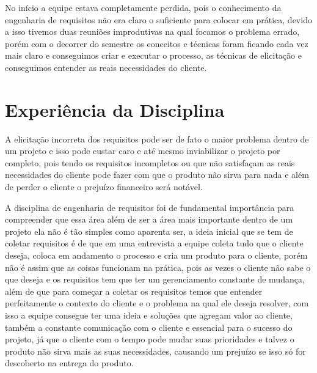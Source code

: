   No início a equipe estava completamente perdida, pois o conhecimento da engenharia de requisitos não era claro o suficiente para colocar em
  prática, devido a isso tivemos duas reuniões improdutivas na qual focamos o problema errado, porém com o decorrer do semestre os conceitos e
  técnicas foram ficando cada vez mais claro e conseguimos criar e executar o processo, as técnicas de elicitação e conseguimos entender as
  reais necessidades do cliente.

\section{Experiência da Disciplina}

  A elicitação incorreta dos requisitos pode ser de fato o maior problema dentro de um projeto e isso pode custar caro e até mesmo inviabilizar
  o projeto por completo, pois tendo os requisitos incompletos ou que não satisfaçam as reais necessidades do cliente pode fazer com que o
  produto não sirva para nada e além de perder o cliente o prejuízo financeiro será notável.


  A disciplina de engenharia de requisitos foi de fundamental import\^{a}ncia para compreender que essa área além de ser a área mais importante
  dentro de um projeto ela não é tão simples como aparenta ser, a ideia inicial que se tem de coletar requisitos é de que em uma entrevista a
  equipe coleta tudo que o cliente deseja, coloca em andamento o processo e cria um produto para o cliente, porém não é assim que as coisas
  funcionam na prática, pois as vezes o cliente não sabe o que deseja e os requisitos tem que ter um gerenciamento constante de mudança, além de
  que para começar a coletar os requisitos temos que entender perfeitamente o contexto do cliente e o problema na qual ele deseja resolver, com
  isso a equipe consegue ter uma ideia e soluções que agregam valor ao cliente, também a constante comunicação com o cliente e essencial para o
  sucesso do projeto, já que o cliente com o tempo pode mudar suas prioridades e talvez o produto não sirva mais as suas necessidades, causando
  um prejuízo se isso só for descoberto na entrega do produto.

